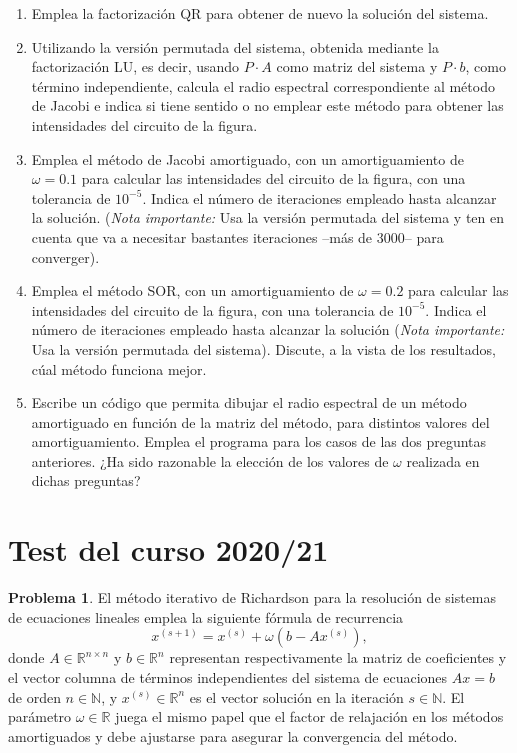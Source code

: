\begin{enumerate}
\begin{enumerate}
\item Emplea la factorización QR para obtener de nuevo la solución del sistema. 

\item Utilizando la versión permutada del sistema, obtenida mediante la factorización LU, es decir, usando $P\cdot A$ como matriz del sistema y $P\cdot b$, como término independiente, calcula el radio espectral correspondiente al método de Jacobi e indica si tiene sentido o no emplear este método para obtener las intensidades del circuito de la figura.

\item Emplea el método de Jacobi amortiguado, con un amortiguamiento de $\omega =0.1$ para calcular las intensidades del circuito de la figura, con una tolerancia de $10^{-5}$. Indica el número de iteraciones empleado hasta alcanzar la solución.  (\emph{Nota importante:} Usa la versión permutada del sistema y ten en cuenta que va a necesitar bastantes iteraciones --más de $3000$-- para converger).

\item Emplea el método SOR, con un amortiguamiento de $\omega =0.2$ para calcular las intensidades del circuito de la figura, con una tolerancia de $10^{-5}$. Indica el número de iteraciones empleado hasta alcanzar la solución (\emph{Nota importante:} Usa la versión permutada del sistema).
Discute, a la vista de los resultados, cúal método funciona mejor.

\item Escribe un código que permita dibujar el radio espectral de un método amortiguado en función de la matriz del método, para distintos valores del amortiguamiento. Emplea el programa para los casos de las dos preguntas anteriores. ¿Ha sido razonable la elección de los valores de $\omega$ realizada en dichas preguntas?
\end{enumerate}
\end{enumerate}

\section{Test del curso 2020/21}
\noindent \textbf{Problema 1}. El método iterativo de Richardson para la resolución de sistemas de ecuaciones lineales emplea la siguiente fórmula de recurrencia
\begin{equation}\label{eq:1}
x^{(s+1)} = x^{(s)} + \omega\left( b - Ax^{(s)}\right),
\end{equation}  
		donde $A \in \mathbb{R}^{n\times n}$ y $b  \in \mathbb{R}^{n}$ representan respectivamente la matriz de coeficientes y el vector columna de términos independientes del sistema de ecuaciones $Ax=b$ de orden $n\in\mathbb{N}$, y $x^{(s)}\in\mathbb{R}^n$ es el vector solución en la iteración $s\in\mathbb{N}$. El parámetro $\omega \in \mathbb{R}$  juega el mismo papel que el factor de relajación en los métodos amortiguados y debe ajustarse para asegurar la convergencia del método.

